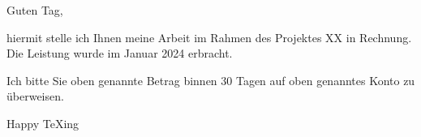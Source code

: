 \documentclass[parskip=half-,german]{scrartcl}
\begin{document}
\begin{letter}{}
\opening{Guten Tag,}

hiermit stelle ich Ihnen meine Arbeit im Rahmen des Projektes XX in Rechnung. Die Leistung wurde im Januar 2024 erbracht. 



\PrintInvoiceTabular
Ich bitte Sie oben genannte Betrag binnen 30 Tagen auf oben genanntes Konto zu überweisen.

\closing{Happy \TeX{}ing}

\end{letter}
\end{document}
